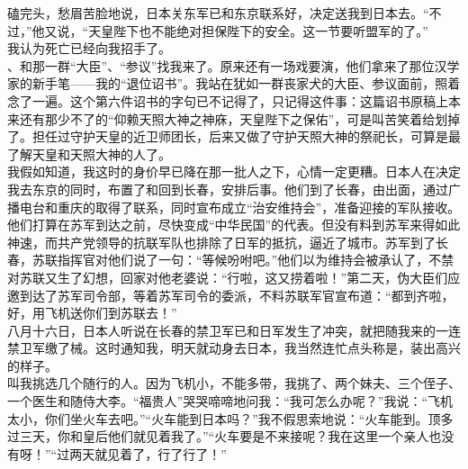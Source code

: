 磕完头，愁眉苦脸地说，日本关东军已和东京联系好，决定送我到日本去。“不过，”他又说，“天皇陛下也不能绝对担保陛下的安全。这一节要听盟军的了。”\\

我认为死亡已经向我招手了。\\

、和那一群“大臣”、“参议”找我来了。原来还有一场戏要演，他们拿来了那位汉学家的新手笔——我的“退位诏书”。我站在犹如一群丧家犬的大臣、参议面前，照着念了一遍。这个第六件诏书的字句已不记得了，只记得这件事：这篇诏书原稿上本来还有那少不了的“仰赖天照大神之神庥，天皇陛下之保佑”，可是叫苦笑着给划掉了。担任过守护天皇的近卫师团长，后来又做了守护天照大神的祭祀长，可算是最了解天皇和天照大神的人了。\\

我假如知道，我这时的身价早已降在那一批人之下，心情一定更糟。日本人在决定我去东京的同时，布置了和回到长春，安排后事。他们到了长春，由出面，通过广播电台和重庆的取得了联系，同时宣布成立“治安维持会”，准备迎接的军队接收。他们打算在苏军到达之前，尽快变成“中华民国”的代表。但没有料到苏军来得如此神速，而共产党领导的抗联军队也排除了日军的抵抗，逼近了城市。苏军到了长春，苏联指挥官对他们说了一句：“等候吩咐吧。”他们以为维持会被承认了，不禁对苏联又生了幻想，回家对他老婆说：“行啦，这又捞着啦！”第二天，伪大臣们应邀到达了苏军司令部，等着苏军司令的委派，不料苏联军官宣布道：“都到齐啦，好，用飞机送你们到苏联去！”\\

八月十六日，日本人听说在长春的禁卫军已和日军发生了冲突，就把随我来的一连禁卫军缴了械。这时通知我，明天就动身去日本，我当然连忙点头称是，装出高兴的样子。\\

叫我挑选几个随行的人。因为飞机小，不能多带，我挑了、两个妹夫、三个侄子、一个医生和随侍大李。“福贵人”哭哭啼啼地问我：“我可怎么办呢？”我说：“飞机太小，你们坐火车去吧。”“火车能到日本吗？”我不假思索地说：“火车能到。顶多过三天，你和皇后他们就见着我了。”“火车要是不来接呢？我在这里一个亲人也没有呀！”“过两天就见着了，行了行了！”\\

